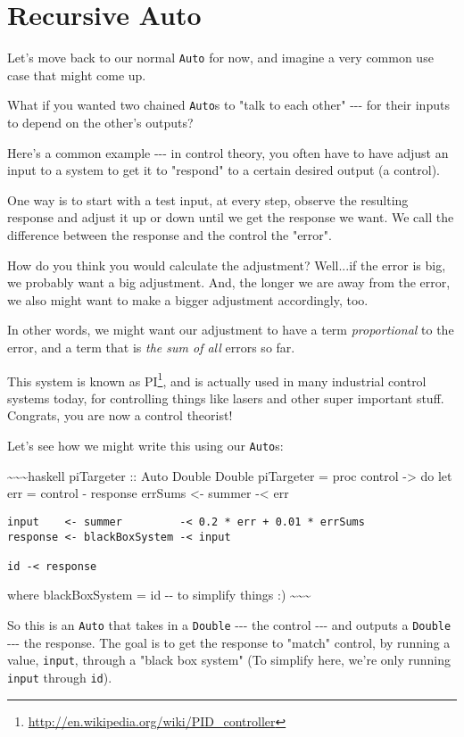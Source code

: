 \documentclass[]{article}
\renewcommand{\href}[2]{#2\footnote{\url{#1}}}
\begin{document}
\section{Recursive Auto}

Let's move back to our normal \texttt{Auto} for now, and imagine a very common
use case that might come up.

What if you wanted two chained \texttt{Auto}s to "talk to each other" -\/-\/-
for their inputs to depend on the other's outputs?

Here's a common example -\/-\/- in control theory, you often have to have adjust
an input to a system to get it to "respond" to a certain desired output (a
control).

One way is to start with a test input, at every step, observe the resulting
response and adjust it up or down until we get the response we want. We call the
difference between the response and the control the "error".

How do you think you would calculate the adjustment? Well...if the error is big,
we probably want a big adjustment. And, the longer we are away from the error,
we also might want to make a bigger adjustment accordingly, too.

In other words, we might want our adjustment to have a term \emph{proportional}
to the error, and a term that is \emph{the sum of all} errors so far.

This system is known as \href{http://en.wikipedia.org/wiki/PID_controller}{PI},
and is actually used in many industrial control systems today, for controlling
things like lasers and other super important stuff. Congrats, you are now a
control theorist!

Let's see how we might write this using our \texttt{Auto}s:

\textasciitilde{}\textasciitilde{}\textasciitilde{}haskell piTargeter :: Auto
Double Double piTargeter = proc control -\textgreater{} do let err = control -
response errSums \textless{}- summer -\textless{} err

\begin{verbatim}
input    <- summer         -< 0.2 * err + 0.01 * errSums
response <- blackBoxSystem -< input

id -< response
\end{verbatim}

where blackBoxSystem = id -\/- to simplify things :)
\textasciitilde{}\textasciitilde{}\textasciitilde{}

So this is an \texttt{Auto} that takes in a \texttt{Double} -\/-\/- the control
-\/-\/- and outputs a \texttt{Double} -\/-\/- the response. The goal is to get
the response to "match" control, by running a value, \texttt{input}, through a
"black box system" (To simplify here, we're only running \texttt{input} through
\texttt{id}).
\end{document}
